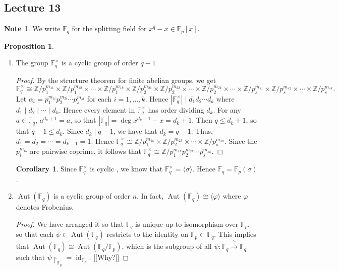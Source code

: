 \documentclass[10pt,letterpaper,cm]{nupset}
\theoremstyle{definition}
\newtheorem{note}[definition]{Note}
\theoremstyle{theorem}
\newtheorem{prop}[definition]{Proposition}
\newtheorem{corollary}[definition]{Corollary}
\theoremstyle{remark}
\newcommand{\F}{\mathbb F}
\newcommand{\Z}{\mathbb Z}
\newcommand{\1}{\mathbf{1}}
\newcommand{\0}{\vec 0}
\DeclareMathOperator{\id}{id}
\DeclareMathOperator{\aut}{Aut}
\begin{document}
\subsection{Lecture 13}

\begin{note}
We write $\F_q$ for the splitting field for $x^q -x \in \F_p[x]$.
\end{note}

\begin{prop} $ $
\begin{enumerate}
\item The group $\F_q^{\times}$ is a cyclic group of order $q-1$
\begin{proof}
By the structure theorem for finite abelian groups, we get 
$$\F_q^{\times} \cong  \Z/p_1^{m_{11}} \times \Z/p_1^{m_{12}} \times \cdots \times \Z/p_1^{m_{1k}} \times \Z/p_2^{m_{21}} \times \Z/p_2^{m_{22}} \times \cdots \times \Z/p_2^{m_{2k}} \times \cdots \times \Z/p_s^{m_{s1}} \times \Z/p_s^{m_{s2}} \times \cdots \times \Z/p_s^{m_{sk}} .$$ 
Let $\alpha_i = p_1^{m_{1i}}p_2^{m_{2i}}\cdots p_s^{m_{si}}$ for each $i=1, \ldots, k$. Hence $|\F_q^{\times}| \mid d_1d_2 \cdots d_k$ where $d_1 \mid d_2 \mid \cdots \mid d_k$. Hence every element in $\F_q^{\times}$ has order dividing $d_k$.  For any $a\in \F_q$, $a^{d_k +1} =a$, so that $|\F_q| = \deg{x^{d_k+1} -x} = d_k+1$. Then $q \leq d_k+1$, so that $q-1 \leq d_k$. Since $d_k \mid q-1$, we have that $d_k = q-1$. Thus, $d_1 = d_2 = \cdots = d_{k-1} = 1$. Hence $\F_q^{\times} \cong \Z/p_1^{m_{1k}} \times \Z/p_2^{m_{2k}} \times \cdots \times \Z/p_s^{m_{sk}}$. Since the $p_i^{m_{ik}}$ are pairwise coprime, it follows that $\F_q^{\times} \cong  \Z/p_1^{m_{1k}} p_2^{m_{2k}} \cdots p_s^{m_{sk}}$. 
\end{proof}
\begin{corollary}
Since $\F_q^{\times}$ is cyclic , we know that $\F_q^{\times} = \langle \sigma \rangle$. Hence $\F_q = \F_p(\sigma)$.
\end{corollary}
\item $\aut(\F_q)$ is a cyclic group of order $n$. In fact, $\aut(\F_q) \cong \langle \varphi \rangle$ where $\varphi$ denotes Frobenius.
\begin{proof}
We have arranged it so that $\F_q$ is unique up to isomorphism over $\F_p$, so that each $\psi \in \aut(\F_q)$ restricts to the identity on $\F_p \subset \F_q$. This implies that $\aut(\F_q) \cong \aut(\F_q/\F_p)$, which is the subgroup of all $\psi : \F_q \overset{\cong}{\longrightarrow} \F_q$ such that $\psi \restriction_{\F_p} = \id_{\F_p}$. {[[Why?]]}

\end{proof}
\end{enumerate}
\end{prop}
\end{document}
